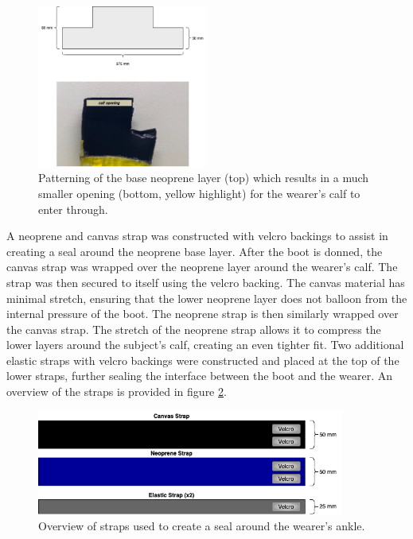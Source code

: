 \documentclass[defaultstyle,11pt]{thesis}
\begin{document}
\begin{figure}
\hypertarget{fig:SA4-baseseal}{%
\centering
\includegraphics[width=0.5\textwidth,height=\textheight]{../fig/SA4/BaseSeal.png}
\caption{Patterning of the base neoprene layer (top) which results in a much smaller opening (bottom, yellow highlight) for the wearer's calf to enter through.}\label{fig:SA4-baseseal}
}
\end{figure}

A neoprene and canvas strap was constructed with velcro backings to assist in creating a seal around the neoprene base layer.
After the boot is donned, the canvas strap was wrapped over the neoprene layer around the wearer's calf.
The strap was then secured to itself using the velcro backing.
The canvas material has minimal stretch, ensuring that the lower neoprene layer does not balloon from the internal pressure of the boot.
The neoprene strap is then similarly wrapped over the canvas strap.
The stretch of the neoprene strap allows it to compress the lower layers around the subject's calf, creating an even tighter fit.
Two additional elastic straps with velcro backings were constructed and placed at the top of the lower straps, further sealing the interface between the boot and the wearer.
An overview of the straps is provided in figure \ref{fig:SA4-straps}.

\begin{figure}
\hypertarget{fig:SA4-straps}{%
\centering
\includegraphics[width=0.9\textwidth,height=\textheight]{../fig/SA4/Straps.png}
\caption{Overview of straps used to create a seal around the wearer's ankle.}\label{fig:SA4-straps}
}
\end{figure}
\end{document}
